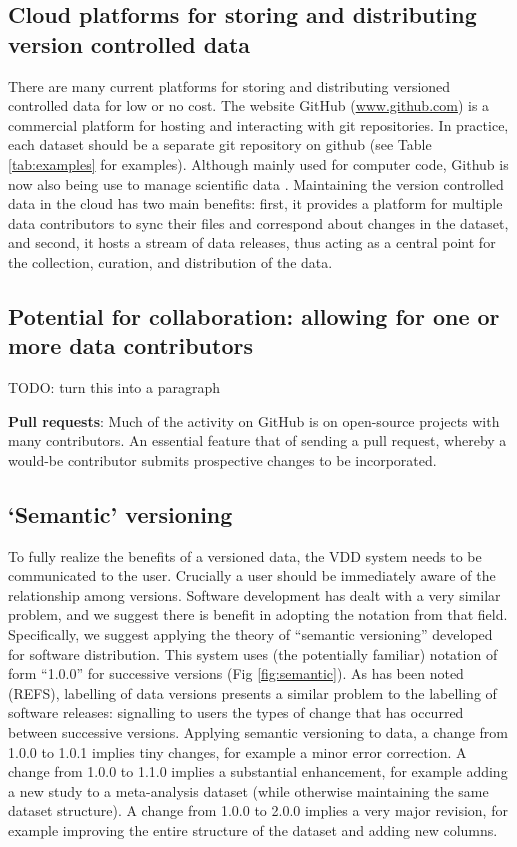 \documentclass[a4paper,11pt]{article}
\newcommand{\smurl}[1]{{\footnotesize\url{#1}}}
\begin{document}
\subsection{Cloud platforms for storing and distributing version controlled data}

There are many current platforms for storing and distributing versioned controlled data for low or no cost.  The website GitHub (\smurl{www.github.com}) is a commercial platform for hosting and interacting with git repositories. In practice, each dataset should be a separate git repository on github (see Table \ref{tab:examples} for examples). Although mainly used for computer code, Github is now also being use to manage scientific data \citep{Perkel-2016}. Maintaining the version controlled data in the cloud has two main benefits: first, it provides a platform for multiple data contributors to sync their files and correspond about changes in the dataset, and second, it hosts a stream of data releases, thus acting as a central point for  the collection, curation, and distribution of the data.

\subsection{Potential for collaboration: allowing for one or more data contributors}

TODO: turn this into a paragraph

\textbf{Pull requests}: Much of the activity on GitHub is on open-source projects with many contributors. An essential feature that of sending a pull request, whereby a would-be contributor submits prospective changes to be incorporated.

\subsection{`Semantic' versioning}

To fully realize the benefits of a versioned data, the VDD system needs to be communicated to the user.  Crucially a user should be immediately aware of the relationship among versions.  Software development has dealt with a very similar problem, and we suggest there is benefit in adopting the notation from that field.  Specifically, we suggest applying the theory of ``semantic versioning'' developed for software distribution. This system uses (the potentially familiar) notation of form ``1.0.0'' for successive versions (Fig \ref{fig:semantic}). As has been noted (REFS), labelling of data versions presents a similar problem to the labelling of software releases: signalling to users the types of change that has occurred between successive versions. Applying semantic versioning to data, a change from 1.0.0 to 1.0.1 implies tiny changes, for example a minor error correction. A change from 1.0.0 to 1.1.0 implies a substantial enhancement, for example adding a new study to a meta-analysis dataset (while otherwise maintaining the same dataset structure). A change from 1.0.0 to 2.0.0 implies a very major revision, for example improving the entire structure of the dataset and adding new columns.
\end{document}
